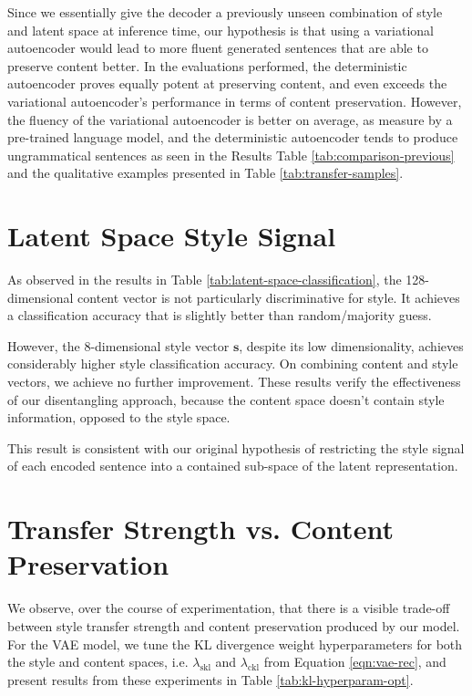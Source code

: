 Since we essentially give the decoder a previously unseen combination of style and latent space at inference time, our hypothesis is that using a variational autoencoder would lead to more fluent generated sentences that are able to preserve content better. In the evaluations performed, the deterministic autoencoder proves equally potent at preserving content, and even exceeds the variational autoencoder's performance in terms of content preservation. However, the fluency of the variational autoencoder is better on average, as measure by a pre-trained language model, and the deterministic autoencoder tends to produce ungrammatical sentences as seen in the Results Table \ref{tab:comparison-previous} and the qualitative examples presented in Table \ref{tab:transfer-samples}.


\section{Latent Space Style Signal}

As observed in the results in Table \ref{tab:latent-space-classification}, the 128-dimensional content vector is not particularly discriminative for style. It achieves a classification accuracy that is slightly better than random/majority guess.

However, the 8-dimensional style vector $\bm s$, despite its low dimensionality, achieves considerably higher style classification accuracy. On combining content and style vectors, we achieve no further improvement. These results verify the effectiveness of our disentangling approach, because the content space doesn't contain style information, opposed to the style space.

This result is consistent with our original hypothesis of restricting the style signal of each encoded sentence into a contained sub-space of the latent representation.


\section{Transfer Strength vs. Content Preservation}

We observe, over the course of experimentation, that there is a visible trade-off between style transfer strength and content preservation produced by our model. For the VAE model, we tune the KL divergence weight hyperparameters for both the style and content spaces, i.e. $\lambda_{\text{skl}}$ and $\lambda_{\text{ckl}}$ from Equation \ref{eqn:vae-rec}, and present results from these experiments in Table \ref{tab:kl-hyperparam-opt}.

